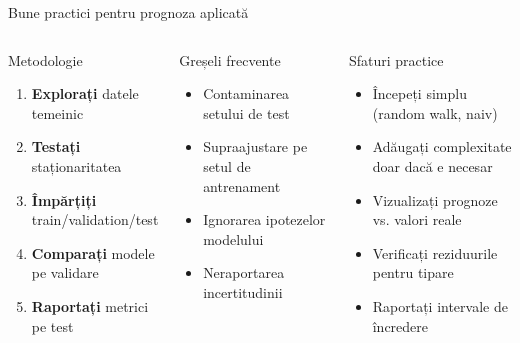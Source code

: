 \documentclass[9pt, aspectratio=169, t]{beamer}
\begin{document}
\begin{frame}{Bune practici pentru prognoza aplicată}
    \footnotesize
    \begin{columns}[T]
        \begin{block}{Metodologie}
            \begin{enumerate}\setlength{\itemsep}{0pt}
                \item \textbf{Explorați} datele temeinic
                \item \textbf{Testați} staționaritatea
                \item \textbf{Împărțiți} train/validation/test
                \item \textbf{Comparați} modele pe validare
                \item \textbf{Raportați} metrici pe test
            \end{enumerate}
        \end{block}

        \vspace{0.1cm}

        \begin{alertblock}{Greșeli frecvente}
            \begin{itemize}\setlength{\itemsep}{0pt}
                \item Contaminarea setului de test
                \item Supraajustare pe setul de antrenament
                \item Ignorarea ipotezelor modelului
                \item Neraportarea incertitudinii
            \end{itemize}
        \end{alertblock}

        \begin{exampleblock}{Sfaturi practice}
            \begin{itemize}\setlength{\itemsep}{0pt}
                \item Începeți simplu (random walk, naiv)
                \item Adăugați complexitate doar dacă e necesar
                \item Vizualizați prognoze vs. valori reale
                \item Verificați reziduurile pentru tipare
                \item Raportați intervale de încredere
            \end{itemize}
        \end{exampleblock}


\end{columns}
\end{frame}
\end{document}
